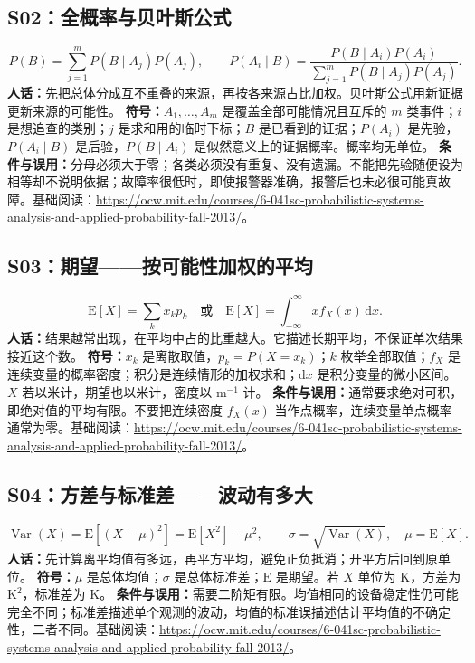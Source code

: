 \documentclass[UTF8,zihao=-4,openany,oneside,fontset=windows]{ctexbook}
\begin{document}
\subsection{S02：全概率与贝叶斯公式}
\begin{equation}
 P(B)=\sum_{j=1}^{m}P(B\mid A_j)P(A_j),\qquad
 P(A_i\mid B)=\frac{P(B\mid A_i)P(A_i)}{\sum_{j=1}^{m}P(B\mid A_j)P(A_j)}.
\end{equation}
\textbf{人话：}先把总体分成互不重叠的来源，再按各来源占比加权。贝叶斯公式用新证据更新来源的可能性。
\textbf{符号：}$A_1,\ldots,A_m$ 是覆盖全部可能情况且互斥的 $m$ 类事件；$i$ 是想追查的类别；$j$ 是求和用的临时下标；$B$ 是已看到的证据；$P(A_i)$ 是先验，$P(A_i\mid B)$ 是后验，$P(B\mid A_i)$ 是似然意义上的证据概率。概率均无单位。
\textbf{条件与误用：}分母必须大于零；各类必须没有重复、没有遗漏。不能把先验随便设为相等却不说明依据；故障率很低时，即使报警器准确，报警后也未必很可能真故障。基础阅读：\url{https://ocw.mit.edu/courses/6-041sc-probabilistic-systems-analysis-and-applied-probability-fall-2013/}。

\subsection{S03：期望——按可能性加权的平均}
\begin{equation}
 \mathrm{E}[X]=\sum_k x_kp_k\quad\text{或}\quad
 \mathrm{E}[X]=\int_{-\infty}^{\infty}x f_X(x)\,\mathrm{d}x.
\end{equation}
\textbf{人话：}结果越常出现，在平均中占的比重越大。它描述长期平均，不保证单次结果接近这个数。
\textbf{符号：}$x_k$ 是离散取值，$p_k=P(X=x_k)$；$k$ 枚举全部取值；$f_X$ 是连续变量的概率密度；积分是连续情形的加权求和；$\mathrm{d}x$ 是积分变量的微小区间。$X$ 若以米计，期望也以米计，密度以 $\mathrm{m}^{-1}$ 计。
\textbf{条件与误用：}通常要求绝对可积，即绝对值的平均有限。不要把连续密度 $f_X(x)$ 当作点概率，连续变量单点概率通常为零。基础阅读：\url{https://ocw.mit.edu/courses/6-041sc-probabilistic-systems-analysis-and-applied-probability-fall-2013/}。

\subsection{S04：方差与标准差——波动有多大}
\begin{equation}
 \operatorname{Var}(X)=\mathrm{E}[(X-\mu)^2]=\mathrm{E}[X^2]-\mu^2,
 \qquad \sigma=\sqrt{\operatorname{Var}(X)},\quad \mu=\mathrm{E}[X].
\end{equation}
\textbf{人话：}先计算离平均值有多远，再平方平均，避免正负抵消；开平方后回到原单位。
\textbf{符号：}$\mu$ 是总体均值；$\sigma$ 是总体标准差；$\mathrm{E}$ 是期望。若 $X$ 单位为 K，方差为 $\mathrm{K}^2$，标准差为 K。
\textbf{条件与误用：}需要二阶矩有限。均值相同的设备稳定性仍可能完全不同；标准差描述单个观测的波动，均值的标准误描述估计平均值的不确定性，二者不同。基础阅读：\url{https://ocw.mit.edu/courses/6-041sc-probabilistic-systems-analysis-and-applied-probability-fall-2013/}。
\end{document}
